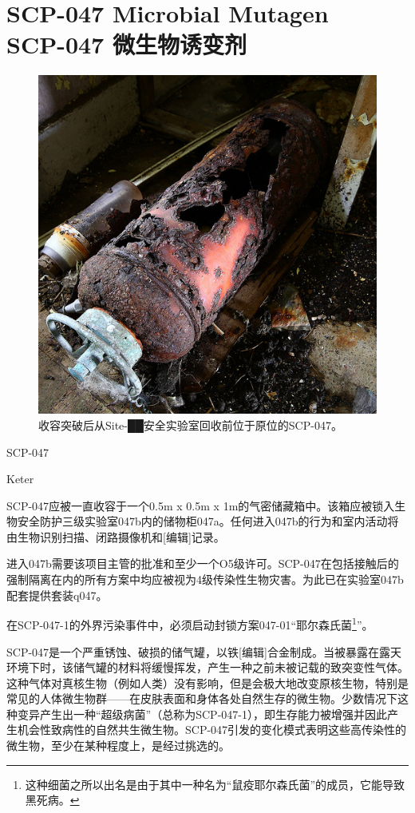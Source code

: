 \chapter[SCP-047 微生物诱变剂]{
    SCP-047 Microbial Mutagen\\
    SCP-047 微生物诱变剂
}

\label{chap:SCP-047}

\begin{figure}[H]
    \centering
    \includegraphics[width=0.5\linewidth]{images/SCP.047.jpg}
    \caption*{收容突破后从Site-██安全实验室回收前位于原位的SCP-047。}
\end{figure}

SCP-047

Keter

SCP-047应被一直收容于一个0.5m x 0.5m x 1m的气密储藏箱中。该箱应被锁入生物安全防护三级实验室047b内的储物柜047a。任何进入047b的行为和室内活动将由生物识别扫描、闭路摄像机和{[}编辑]记录。

进入047b需要该项目主管的批准和至少一个O5级许可。SCP-047在包括接触后的强制隔离在内的所有方案中均应被视为4级传染性生物灾害。为此已在实验室047b配套提供套装q047。

在SCP-047-1的外界污染事件中，必须启动封锁方案047-01“耶尔森氏菌\footnote{这种细菌之所以出名是由于其中一种名为“鼠疫耶尔森氏菌”的成员，它能导致黑死病。}”。

SCP-047是一个严重锈蚀、破损的储气罐，以铁{[}编辑]合金制成。当被暴露在露天环境下时，该储气罐的材料将缓慢挥发，产生一种之前未被记载的致突变性气体。这种气体对真核生物（例如人类）没有影响，但是会极大地改变原核生物，特别是常见的人体微生物群——在皮肤表面和身体各处自然生存的微生物。少数情况下这种变异产生出一种“超级病菌”（总称为SCP-047-1），即生存能力被增强并因此产生机会性致病性的自然共生微生物。SCP-047引发的变化模式表明这些高传染性的微生物，至少在某种程度上，是经过挑选的。

